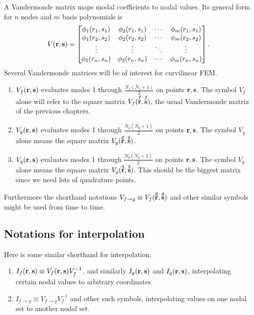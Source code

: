 A Vandermonde matrix maps modal coefficients to nodal values.  Its general form for $n$ nodes and $m$ basis polynomials is
%
\begin{equation}
V(\textbf{r}, \textbf{s}) =
\begin{bmatrix}
\phi_1(r_1, s_1) & \phi_2(r_1, s_1) & \cdots & \phi_m(r_1, s_1) \\
\phi_1(r_2, s_2) & \phi_2(r_2, s_2) & \cdots & \phi_m(r_2, s_2) \\
\vdots & \vdots & \ddots & \vdots \\
\phi_1(r_n, s_n) & \phi_2(r_n, s_n) & \cdots & \phi_m(r_n, s_n)
\end{bmatrix}.
\end{equation}
%
Several Vandermonde matrices will be of interest for curvilinear FEM.
%
\begin{enumerate}
  \item $V_f(\textbf{r}, \textbf{s})$ evaluates modes 1 through $\frac{N_f(N_f+1)}{2}$ on points $\textbf{r}, \textbf{s}$.  The symbol $V_f$ alone will refer to the square matrix $V_f(\overset{f}{\textbf{r}}, \overset{f}{\textbf{s}})$, the usual Vandermonde matrix of the previous chapters.
  \item $V_g(\textbf{r}, \textbf{s})$ evaluates modes 1 through $\frac{N_g(N_g+1)}{2}$ on points $\textbf{r}, \textbf{s}$.  The symbol $V_g$ alone means the square matrix $V_g(\overset{g}{\textbf{r}}, \overset{g}{\textbf{s}})$.
  \item $V_q(\textbf{r}, \textbf{s})$ evaluates modes 1 through $\frac{N_q(N_q+1)}{2}$ on points $\textbf{r}, \textbf{s}$.  The symbol $V_q$ alone means the square matrix $V_q(\overset{q}{\textbf{r}}, \overset{q}{\textbf{s}})$.  This should be the biggest matrix since we need lots of quadrature points.
\end{enumerate}
%
Furthermore the shorthand notations $V_{f \rightarrow g} \equiv V_f(\overset{g}{\textbf{r}}, \overset{g}{\textbf{s}})$ and other similar symbols might be used from time to time.

\subsection{Notations for interpolation}

Here is some similar shorthand for interpolation.
%
\begin{enumerate}
  \item $I_f(\textbf{r}, \textbf{s}) \equiv V_f(\textbf{r}, \textbf{s}) V_f^{-1}$, and similarly $I_g(\textbf{r}, \textbf{s})$ and $I_q(\textbf{r}, \textbf{s})$, interpolating certain nodal values to arbitrary coordinates
  \item $I_{f \rightarrow g} \equiv V_{f \rightarrow g} V_f^{-1}$ and other such symbols, interpolating values on one nodal set to another nodal set.
\end{enumerate}

